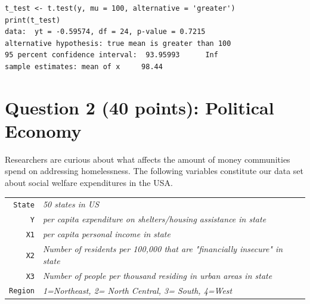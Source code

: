 \documentclass[12pt,letterpaper]{article}
\begin{document}
\begin{enumerate}
\begin{verbatim}
t_test <- t.test(y, mu = 100, alternative = 'greater') 
print(t_test)
data:  yt = -0.59574, df = 24, p-value = 0.7215
alternative hypothesis: true mean is greater than 100
95 percent confidence interval:  93.95993      Inf
sample estimates: mean of x     98.44 
\end{verbatim}

\end{enumerate}

\newpage

	\section*{Question 2 (40 points): Political Economy}

\noindent Researchers are curious about what affects the amount of money communities spend on addressing homelessness. The following variables constitute our data set about social welfare expenditures in the USA. \\
\vspace{.5cm}


\begin{tabular}{r|l}
	\texttt{State} &\emph{50 states in US} \\
	\texttt{Y} & \emph{per capita expenditure on shelters/housing assistance in state}\\
	\texttt{X1} &\emph{per capita personal income in state} \\
	\texttt{X2} &  \emph{Number of residents per 100,000 that are "financially insecure" in state}\\
	\texttt{X3} &  \emph{Number of people per thousand residing in urban areas in state} \\
	\texttt{Region} &  \emph{1=Northeast, 2= North Central, 3= South, 4=West} \\
\end{tabular}
\end{document}
